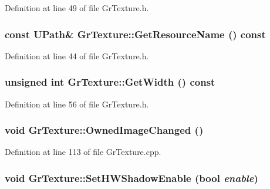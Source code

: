 Definition at line 49 of file GrTexture.h.\hypertarget{class_gr_texture_9dd7315f4f9ce115291f8d3fdc149594}{
\subsubsection[{GetResourceName}]{\setlength{\rightskip}{0pt plus 5cm}const {\bf UPath}\& GrTexture::GetResourceName () const}}
\label{class_gr_texture_9dd7315f4f9ce115291f8d3fdc149594}




Definition at line 44 of file GrTexture.h.\hypertarget{class_gr_texture_74f19716b3fb47bed8fa89164304ff4a}{
\subsubsection[{GetWidth}]{\setlength{\rightskip}{0pt plus 5cm}unsigned int GrTexture::GetWidth () const}}
\label{class_gr_texture_74f19716b3fb47bed8fa89164304ff4a}




Definition at line 56 of file GrTexture.h.\hypertarget{class_gr_texture_4d7fd1aa369f4083de4dee05abc8020b}{
\subsubsection[{OwnedImageChanged}]{\setlength{\rightskip}{0pt plus 5cm}void GrTexture::OwnedImageChanged ()}}
\label{class_gr_texture_4d7fd1aa369f4083de4dee05abc8020b}




Definition at line 113 of file GrTexture.cpp.\hypertarget{class_gr_texture_5e10056726037b39e6980e9cd81c984d}{
\subsubsection[{SetHWShadowEnable}]{\setlength{\rightskip}{0pt plus 5cm}void GrTexture::SetHWShadowEnable (bool {\em enable})}}
\label{class_gr_texture_5e10056726037b39e6980e9cd81c984d}




